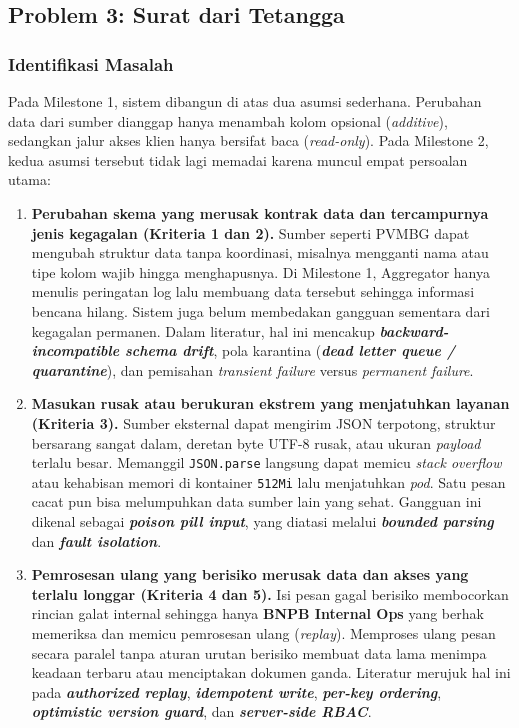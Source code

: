 \subsection{Problem 3: Surat dari Tetangga}

\subsubsection{Identifikasi Masalah}

Pada Milestone 1, sistem dibangun di atas dua asumsi sederhana. Perubahan data dari sumber dianggap hanya menambah kolom opsional (\textit{additive}), sedangkan jalur akses klien hanya bersifat baca (\textit{read-only}). Pada Milestone 2, kedua asumsi tersebut tidak lagi memadai karena muncul empat persoalan utama:

\begin{enumerate}
  \item \textbf{Perubahan skema yang merusak kontrak data dan tercampurnya jenis kegagalan (Kriteria 1 dan 2).}
  Sumber seperti PVMBG dapat mengubah struktur data tanpa koordinasi, misalnya mengganti nama atau tipe kolom wajib hingga menghapusnya. Di Milestone 1, Aggregator hanya menulis peringatan log lalu membuang data tersebut sehingga informasi bencana hilang. Sistem juga belum membedakan gangguan sementara dari kegagalan permanen. Dalam literatur, hal ini mencakup \textbf{\textit{backward-incompatible schema drift}}, pola karantina (\textbf{\textit{dead letter queue / quarantine}}), dan pemisahan \textit{transient failure} versus \textit{permanent failure}.

  \item \textbf{Masukan rusak atau berukuran ekstrem yang menjatuhkan layanan (Kriteria 3).}
  Sumber eksternal dapat mengirim JSON terpotong, struktur bersarang sangat dalam, deretan byte UTF-8 rusak, atau ukuran \textit{payload} terlalu besar. Memanggil \texttt{JSON.parse} langsung dapat memicu \textit{stack overflow} atau kehabisan memori di kontainer \texttt{512Mi} lalu menjatuhkan \textit{pod}. Satu pesan cacat pun bisa melumpuhkan data sumber lain yang sehat. Gangguan ini dikenal sebagai \textbf{\textit{poison pill input}}, yang diatasi melalui \textbf{\textit{bounded parsing}} dan \textbf{\textit{fault isolation}}.

  \item \textbf{Pemrosesan ulang yang berisiko merusak data dan akses yang terlalu longgar (Kriteria 4 dan 5).}
  Isi pesan gagal berisiko membocorkan rincian galat internal sehingga hanya \textbf{BNPB Internal Ops} yang berhak memeriksa dan memicu pemrosesan ulang (\textit{replay}). Memproses ulang pesan secara paralel tanpa aturan urutan berisiko membuat data lama menimpa keadaan terbaru atau menciptakan dokumen ganda. Literatur merujuk hal ini pada \textbf{\textit{authorized replay}}, \textbf{\textit{idempotent write}}, \textbf{\textit{per-key ordering}}, \textbf{\textit{optimistic version guard}}, dan \textbf{\textit{server-side RBAC}}.


\end{enumerate}

